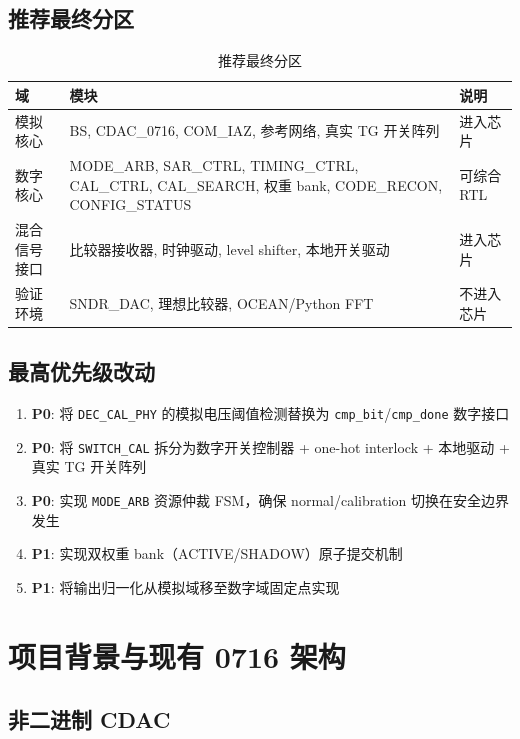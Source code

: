 \documentclass[UTF8,a4paper,11pt]{ctexart}
\begin{document}
\subsection{推荐最终分区}

\begin{table}[H]
\centering
\caption{推荐最终分区}
\label{tab:recommended-partition}
\begin{tabular}{llp{7cm}}
\toprule
域 & 模块 & 说明 \\
\midrule
模拟核心 & BS, CDAC\_0716, COM\_IAZ, 参考网络, 真实 TG 开关阵列 & 进入芯片 \\
数字核心 & MODE\_ARB, SAR\_CTRL, TIMING\_CTRL, CAL\_CTRL, CAL\_SEARCH, 权重 bank, CODE\_RECON, CONFIG\_STATUS & 可综合 RTL \\
混合信号接口 & 比较器接收器, 时钟驱动, level shifter, 本地开关驱动 & 进入芯片 \\
验证环境 & SNDR\_DAC, 理想比较器, OCEAN/Python FFT & 不进入芯片 \\
\bottomrule
\end{tabular}
\end{table}

\subsection{最高优先级改动}

\begin{enumerate}[leftmargin=2em]
\item \textbf{P0}: 将 \texttt{DEC\_CAL\_PHY} 的模拟电压阈值检测替换为 \texttt{cmp\_bit}/\texttt{cmp\_done} 数字接口
\item \textbf{P0}: 将 \texttt{SWITCH\_CAL} 拆分为数字开关控制器 + one-hot interlock + 本地驱动 + 真实 TG 开关阵列
\item \textbf{P0}: 实现 \texttt{MODE\_ARB} 资源仲裁 FSM，确保 normal/calibration 切换在安全边界发生
\item \textbf{P1}: 实现双权重 bank（ACTIVE/SHADOW）原子提交机制
\item \textbf{P1}: 将输出归一化从模拟域移至数字域固定点实现
\end{enumerate}

\section{项目背景与现有 0716 架构}

\subsection{非二进制 CDAC}
\end{document}
